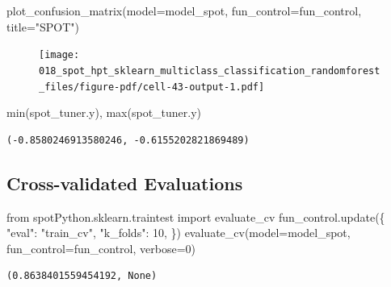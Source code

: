 \documentclass[
  letterpaper,
  DIV=11,
  numbers=noendperiod]{scrreprt}
\newenvironment{Shaded}{\begin{snugshade}}{\end{snugshade}}
\newcommand{\BuiltInTok}[1]{\textcolor[rgb]{0.00,0.23,0.31}{#1}}
\newcommand{\DecValTok}[1]{\textcolor[rgb]{0.68,0.00,0.00}{#1}}
\newcommand{\ImportTok}[1]{\textcolor[rgb]{0.00,0.46,0.62}{#1}}
\newcommand{\NormalTok}[1]{\textcolor[rgb]{0.00,0.23,0.31}{#1}}
\newcommand{\OperatorTok}[1]{\textcolor[rgb]{0.37,0.37,0.37}{#1}}
\newcommand{\StringTok}[1]{\textcolor[rgb]{0.13,0.47,0.30}{#1}}
\begin{document}
\begin{Shaded}
\begin{Highlighting}[]
\NormalTok{plot\_confusion\_matrix(model}\OperatorTok{=}\NormalTok{model\_spot, fun\_control}\OperatorTok{=}\NormalTok{fun\_control, title}\OperatorTok{=}\StringTok{"SPOT"}\NormalTok{)}
\end{Highlighting}
\end{Shaded}

\begin{figure}[H]

{\centering \texttt{[image: 018\_spot\_hpt\_sklearn\_multiclass\_classification\_randomforest\_files/figure-pdf/cell-43-output-1.pdf]}

}

\end{figure}

\begin{Shaded}
\begin{Highlighting}[]
\BuiltInTok{min}\NormalTok{(spot\_tuner.y), }\BuiltInTok{max}\NormalTok{(spot\_tuner.y)}
\end{Highlighting}
\end{Shaded}

\begin{verbatim}
(-0.8580246913580246, -0.6155202821869489)
\end{verbatim}

\hypertarget{cross-validated-evaluations}{%
\subsection{Cross-validated
Evaluations}\label{cross-validated-evaluations}}

\begin{Shaded}
\begin{Highlighting}[]
\ImportTok{from}\NormalTok{ spotPython.sklearn.traintest }\ImportTok{import}\NormalTok{ evaluate\_cv}
\NormalTok{fun\_control.update(\{}
     \StringTok{"eval"}\NormalTok{: }\StringTok{"train\_cv"}\NormalTok{,}
     \StringTok{"k\_folds"}\NormalTok{: }\DecValTok{10}\NormalTok{,}
\NormalTok{\})}
\NormalTok{evaluate\_cv(model}\OperatorTok{=}\NormalTok{model\_spot, fun\_control}\OperatorTok{=}\NormalTok{fun\_control, verbose}\OperatorTok{=}\DecValTok{0}\NormalTok{)}
\end{Highlighting}
\end{Shaded}

\begin{verbatim}
(0.8638401559454192, None)
\end{verbatim}
\end{document}
